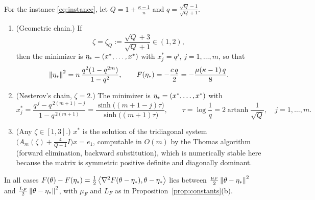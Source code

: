 \begin{proposition}
\label{prop:minimizer}
For the instance \eqref{eq:instance}, let $Q=1+\frac{\kappa-1}n$ and $q=\frac{\sqrt Q-1}{\sqrt Q+1}$.
\begin{enumerate}[nosep,label=(\alph*)]
\item (Geometric chain.) If
\begin{equation}
\label{eq:zetaQ}
\zeta=\zeta_Q:=\frac{\sqrt Q+3}{\sqrt Q+1}\in(1,2),
\end{equation}
then the minimizer is $\eta_\ast=(x^\ast,\dots,x^\ast)$ with $x^\ast_j=q^j$, $j=1,\dots,m$, so that
\[
\left\|\eta_\ast\right\|^2=n\,\frac{q^2(1-q^{2m})}{1-q^2},\qquad F(\eta_\ast)=-\frac{c\,q}{2}=-\frac{\mu(\kappa-1)\,q}{8}.
\]
\item (Nesterov's chain, $\zeta=2$.) The minimizer is $\eta_\ast=(x^\ast,\dots,x^\ast)$ with
\[
x^\ast_j=\frac{q^{\,j}-q^{\,2(m+1)-j}}{1-q^{\,2(m+1)}}=\frac{\sinh\big((m+1-j)\tau\big)}{\sinh\big((m+1)\tau\big)},\qquad \tau=\log\frac1q=2\operatorname{artanh}\frac1{\sqrt Q},\quad j=1,\dots,m .
\]
\item (Any $\zeta\in[1,3]$.) $x^\ast$ is the solution of the tridiagonal system $\big(A_m(\zeta)+\frac{4}{Q-1}I\big)x=e_1$, computable in $O(m)$ by the Thomas algorithm (forward elimination, backward substitution), which is numerically stable here because the matrix is symmetric positive definite and diagonally dominant.
\end{enumerate}
In all cases $F(\theta)-F(\eta_\ast)=\frac12\left\langle \nabla^2F(\theta-\eta_\ast), \theta-\eta_\ast \right\rangle$ lies between $\frac{\mu_F}2\left\|\theta-\eta_\ast\right\|^2$ and $\frac{L_F}2\left\|\theta-\eta_\ast\right\|^2$, with $\mu_F$ and $L_F$ as in Proposition~\ref{prop:constants}(b).
\end{proposition}

